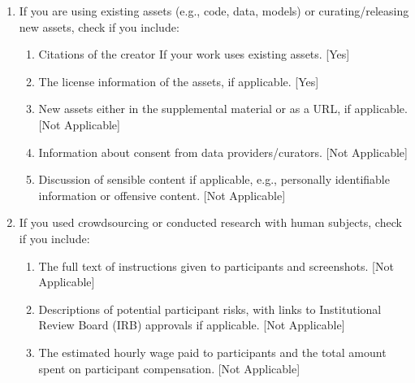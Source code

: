 \documentclass[twoside]{article}
\begin{document}
\begin{enumerate}
 \item If you are using existing assets (e.g., code, data, models) or curating/releasing new assets, check if you include:
 \begin{enumerate}
   \item Citations of the creator If your work uses existing assets. [Yes]
   \item The license information of the assets, if applicable. [Yes]
   \item New assets either in the supplemental material or as a URL, if applicable. [Not Applicable]
   \item Information about consent from data providers/curators. [Not Applicable]
   \item Discussion of sensible content if applicable, e.g., personally identifiable information or offensive content. [Not Applicable]
 \end{enumerate}

 \item If you used crowdsourcing or conducted research with human subjects, check if you include:
 \begin{enumerate}
   \item The full text of instructions given to participants and screenshots. [Not Applicable]
   \item Descriptions of potential participant risks, with links to Institutional Review Board (IRB) approvals if applicable. [Not Applicable]
   \item The estimated hourly wage paid to participants and the total amount spent on participant compensation. [Not Applicable]
 \end{enumerate}

 \end{enumerate}


\clearpage
\appendix
\onecolumn

\end{document}
